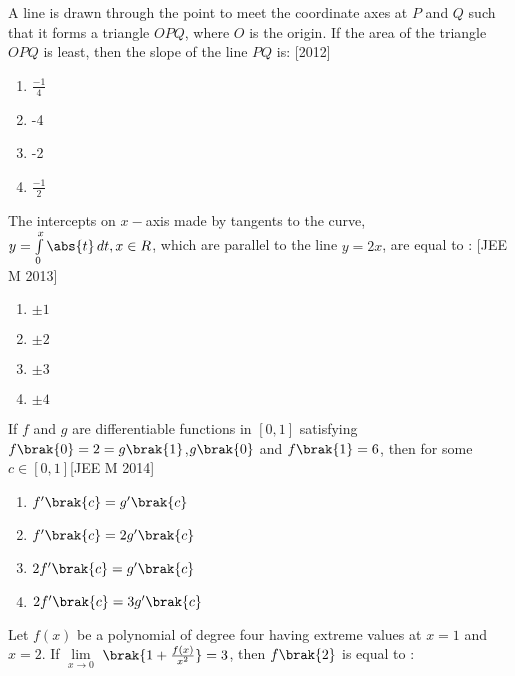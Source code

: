 \item A line is drawn through the point to meet the coordinate axes at $P$ and $Q$ such that it forms a triangle $OPQ$, where $O$ is the origin. If the area of the triangle $OPQ$ is least, then the slope of the line $PQ$ is: \hfill{[2012]}\\
\begin{enumerate}
    \item  $\frac{-1}{4}$\\
    \item  -4\\
    \item  -2\\
    \item  $\frac{-1}{2}$\\
\end{enumerate}
\item The intercepts on $x-$axis made by tangents to the curve, $y=\int\limits_0^x\abs{t} \, dt, x\in R$, which are parallel to the line $y=2x$, are equal to : {[JEE M 2013]}\\
\begin{enumerate}
    \item  $\pm1$\\
    \item  $\pm2$\\
    \item  $\pm3$\\
    \item  $\pm4$\\
    
\end{enumerate}

\item If $f$ and $g$ are differentiable functions in ${[0,1]}$ satisfying $f\brak{0}=2=g\brak{1}$,$g\brak{0}$ and $f\brak{1}=6$, then for some $c\in {[0,1]}$\hfill[JEE M 2014]
\begin{enumerate}
    \item  $f'\brak{c}=g'\brak{c}$\\
    \item  $f'\brak{c}=2g'\brak{c}$\\
    \item  $2f'\brak{c}=g'\brak{c}$\\
    \item  $2f'\brak{c}=3g'\brak{c}$\\
\end{enumerate}
\item Let $f(x)$ be a polynomial of degree four having extreme values at $x=1$ and $x=2$. If $\lim\limits_{x\to 0}$ $\brak{1+\frac{f(x)}{x^{2}}}=3$, then $f\brak{2}$ is equal to :

